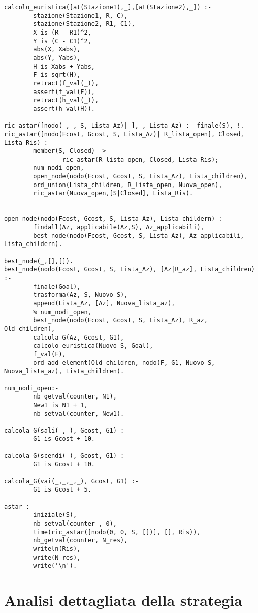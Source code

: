 \begin{lstlisting}
calcolo_euristica([at(Stazione1),_],[at(Stazione2),_]) :-
        stazione(Stazione1, R, C),
        stazione(Stazione2, R1, C1),
        X is (R - R1)^2,
        Y is (C - C1)^2,
        abs(X, Xabs),
        abs(Y, Yabs),
        H is Xabs + Yabs,
        F is sqrt(H),
        retract(f_val(_)),
        assert(f_val(F)),
        retract(h_val(_)),
        assert(h_val(H)).

ric_astar([nodo(_,_, S, Lista_Az)|_],_, Lista_Az) :- finale(S), !.
ric_astar([nodo(Fcost, Gcost, S, Lista_Az)| R_lista_open], Closed, Lista_Ris) :-
        member(S, Closed) ->
                ric_astar(R_lista_open, Closed, Lista_Ris);
        num_nodi_open,
        open_node(nodo(Fcost, Gcost, S, Lista_Az), Lista_children),
        ord_union(Lista_children, R_lista_open, Nuova_open),
        ric_astar(Nuova_open,[S|Closed], Lista_Ris).


open_node(nodo(Fcost, Gcost, S, Lista_Az), Lista_childern) :-
        findall(Az, applicabile(Az,S), Az_applicabili),
        best_node(nodo(Fcost, Gcost, S, Lista_Az), Az_applicabili, Lista_childern).

best_node(_,[],[]).
best_node(nodo(Fcost, Gcost, S, Lista_Az), [Az|R_az], Lista_children) :-
        finale(Goal),
        trasforma(Az, S, Nuovo_S),
        append(Lista_Az, [Az], Nuova_lista_az),
        % num_nodi_open,
        best_node(nodo(Fcost, Gcost, S, Lista_Az), R_az, Old_children),
        calcola_G(Az, Gcost, G1),
        calcolo_euristica(Nuovo_S, Goal),
        f_val(F),
        ord_add_element(Old_children, nodo(F, G1, Nuovo_S, Nuova_lista_az), Lista_children).

num_nodi_open:-
        nb_getval(counter, N1),
        New1 is N1 + 1,
        nb_setval(counter, New1).

calcola_G(sali(_,_), Gcost, G1) :-
        G1 is Gcost + 10.

calcola_G(scendi(_), Gcost, G1) :-
        G1 is Gcost + 10.

calcola_G(vai(_,_,_,_), Gcost, G1) :-
        G1 is Gcost + 5.

astar :-
        iniziale(S),
        nb_setval(counter , 0),
        time(ric_astar([nodo(0, 0, S, [])], [], Ris)),
        nb_getval(counter, N_res),
        writeln(Ris),
        write(N_res),
        write('\n').
\end{lstlisting}

\section{Analisi dettagliata della strategia}

